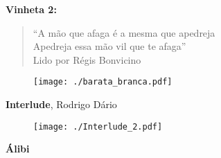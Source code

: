 \begin{absolutelynopagebreak}
\textbf{Vinheta 2:}


\begin{verse}
``A mão que afaga é a mesma que apedreja\\
Apedreja essa mão vil que te afaga''\\[5pt]
Lido por Régis Bonvicino
\end{verse}

\thispagestyle{empty}

\begin{vplace}
\begin{figure}[H]
\begin{adjustwidth}{-1.7cm}{}
  \vspace*{11cm}
  \texttt{[image: ./barata\_branca.pdf]}  
\end{adjustwidth}

\end{figure}
\end{vplace}

\end{absolutelynopagebreak}

\pagebreak

\begin{absolutelynopagebreak}
\textbf{Interlude}, Rodrigo Dário

\thispagestyle{empty}

\begin{vplace}
\begin{figure}[H]
\begin{adjustwidth}{-3.2cm}{}
  \vspace*{9cm}
  \texttt{[image: ./Interlude\_2.pdf]}  
\end{adjustwidth}

\end{figure}
\end{vplace}

\end{absolutelynopagebreak}

\pagebreak

\textbf{Álibi}

